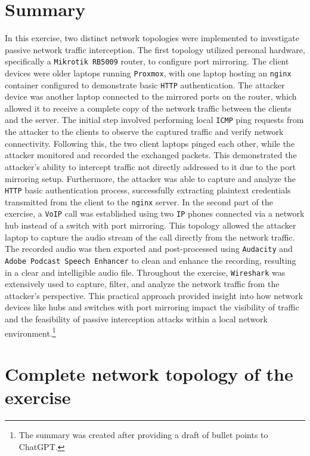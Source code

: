 \documentclass[a4paper]{article}
\newcommand{\abc}{\hfill \break}
\begin{document}
\section{Summary}
In this exercise, two distinct network topologies were implemented to investigate passive network traffic interception. The first topology utilized personal hardware, specifically a \texttt{Mikrotik RB5009} router, to configure port mirroring. The client devices were older laptops running \texttt{Proxmox}, with one laptop hosting an \texttt{nginx} container configured to demonstrate basic \texttt{HTTP} authentication. The attacker device was another laptop connected to the mirrored ports on the router, which allowed it to receive a complete copy of the network traffic between the clients and the server.\abc
The initial step involved performing local \texttt{ICMP} ping requests from the attacker to the clients to observe the captured traffic and verify network connectivity. Following this, the two client laptops pinged each other, while the attacker monitored and recorded the exchanged packets. This demonstrated the attacker's ability to intercept traffic not directly addressed to it due to the port mirroring setup. Furthermore, the attacker was able to capture and analyze the \texttt{HTTP} basic authentication process, successfully extracting plaintext credentials transmitted from the client to the \texttt{nginx} server.\abc
In the second part of the exercise, a \texttt{VoIP} call was established using two \texttt{IP} phones connected via a network hub instead of a switch with port mirroring. This topology allowed the attacker laptop to capture the audio stream of the call directly from the network traffic. The recorded audio was then exported and post-processed using \texttt{Audacity} and \texttt{Adobe Podcast Speech Enhancer} to clean and enhance the recording, resulting in a clear and intelligible audio file.\abc
Throughout the exercise, \texttt{Wireshark} was extensively used to capture, filter, and analyze the network traffic from the attacker’s perspective. This practical approach provided insight into how network devices like hubs and switches with port mirroring impact the visibility of traffic and the feasibility of passive interception attacks within a local network environment.\footnote{The summary was created after providing a draft of bullet points to ChatGPT.}

\newpage

\section{Complete network topology of the exercise}
\end{document}
